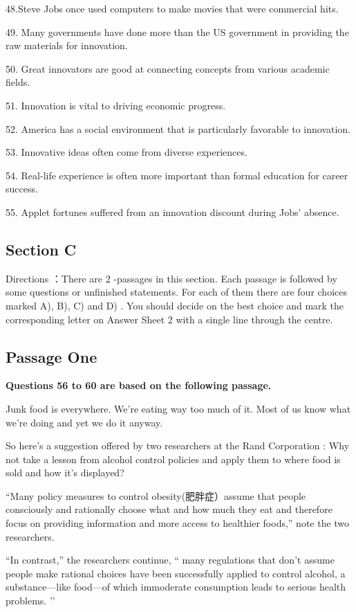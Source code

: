 \documentclass[UTF8,11pt]{ctexart}
\begin{document}
48.Steve Jobs once used computers to make movies that were commercial hits.


49. Many governments have done more than the US government in providing the raw materials for innovation.


50. Great innovators are good at connecting concepts from various academic fields.


51. Innovation is vital to driving economic progress.


52. America has a social environment that is particularly favorable to innovation.


53. Innovative ideas often come from diverse experiences.


54. Real-life experience is often more important than formal education for career success.


55. Applet fortunes suffered from an innovation discount during Jobs’ absence.


\subsection*{\textbf{Section C}}


Directions ：There are 2 -passages in this section. Each passage is followed by some questions or unfinished statements. For each of them there are four choices marked A), B), C) and D) . You should decide on the best choice and mark the corresponding letter on Answer Sheet 2 with a single line through the centre.


\subsection*{\textbf{Passage One}}


\textbf{Questions 56 to 60 are based on the following passage.}


Junk food is everywhere. We’re eating way too much of it. Most of us know what we’re doing and yet we do it anyway.


So here’s a suggestion offered by two researchers at the Rand Corporation : Why not take a lesson from alcohol control policies and apply them to where food is sold and how it’s displayed?


“Many policy measures to control obesity(肥胖症）assume that people consciously and rationally choose what and how much they eat and therefore focus on providing information and more access to healthier foods,” note the two researchers.


“In contrast,” the researchers continue, “ many regulations that don’t assume people make rational choices have been successfully applied to control alcohol, a substance—like food—of which immoderate consumption leads to serious health problems. ’’
\end{document}
